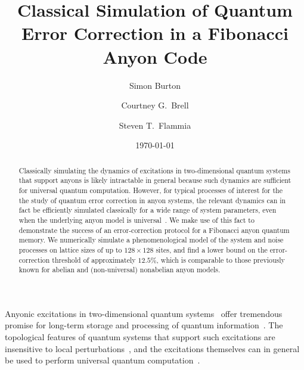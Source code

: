 \documentclass[aps, prl, letterpaper, twocolumn, superscriptaddress, notitlepage, 10pt]{revtex4-1}
\begin{document}
\title{Classical Simulation of Quantum Error Correction in a Fibonacci Anyon Code}

\author{Simon Burton}
\author{Courtney G.\ Brell}
\author{Steven T.\ Flammia}

\date{\today}

\begin{abstract}
Classically simulating the dynamics of excitations in two-dimensional quantum systems that support anyons is likely intractable in general because such dynamics are sufficient for universal quantum computation. However, for typical processes of interest for the the study of quantum error correction in anyon systems, the relevant dynamics can in fact be efficiently simulated classically for a wide range of system parameters, even when the underlying anyon model is universal~\cite{RGsim}. We make use of this fact to demonstrate the success of an error-correction protocol for a Fibonacci anyon quantum memory. We numerically simulate a phenomenological model of the system and noise processes on lattice sizes of up to $128\times128$ sites, and find a lower bound on the error-correction threshold of approximately $12.5\%$, which is comparable to those previously known for abelian and (non-universal) nonabelian anyon models.
\end{abstract}

\maketitle


Anyonic excitations in two-dimensional quantum systems~\cite{Wilczek1990} offer 
tremendous promise for long-term storage and processing of quantum 
information~\cite{Kitaev2003}. The topological features of quantum systems that support 
such excitations are insensitive to local 
perturbations~\cite{Bravyi2010, *Bravyi2011a, *Michalakis2013}, and the excitations 
themselves can in general be used to perform universal quantum 
computation~\cite{Freedman2002, *Freedman2002b}. 
\end{document}
